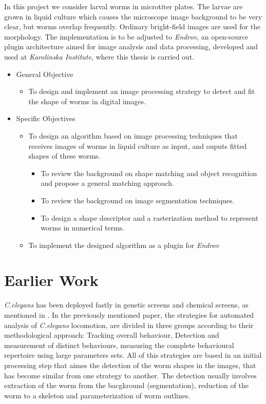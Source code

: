 In this project we consider larval worms in microtiter plates. The larvae are 
grown in liquid culture which causes the microscope image background to be 
very clear, but worms overlap frequently. Ordinary bright-field images are 
used for the morphology. The implementation is to be adjusted to \emph{Endrov},
an open-source plugin architecture aimed for image analysis and data processing,
developed and used at \emph{Karolinska Institute}, where this thesis is 
carried out.

\begin{itemize}
\item General Objective
  \begin{itemize}
  \item To design and implement an image processing strategy to detect
    and fit the shape of worms in digital images.    
  \end{itemize}
\end{itemize}
\begin{itemize}
\item Specific Objectives
  \begin{itemize}
  \item To design an algorithm based on image processing techniques that
    receives images of worms in liquid culture as input, and ouputs
    fitted shapes of these worms.
    \begin{itemize}
    \item To review the background on shape matching and object recognition and
      propose a general matching approach.
    \item To review the background on image segmentation techniques.
    \item To design a shape descriptor and a rasterization method to
      represent worms in numerical terms.
    \end{itemize}
  \item To implement the designed algorithm as a plugin for \emph{Endrov}
  \end{itemize}
\end{itemize}

\section{Earlier Work}

\emph{C.elegans} has been deployed fastly in genetic screens and chemical
screens, as mentioned in \cite{automated}. In the previously mentioned paper,
the strategies for automated analysis of \emph{C.elegans} locomotion, are
divided in three groups according to their methodological approach:
Tracking overall behaviour, Detection and measurement of distinct behaviours,
measuring the complete behavioural repertoire using large parameters sets.
All of this strategies are based in an initial processing step that aimes 
the detection of the worm shapes in the images, that has become similar
from one strategy to another. The detection usually involves extraction
of the worm from the bacgkround (segmentation), reduction of the worm to a
skeleton and parameterization of worm outlines.\\

